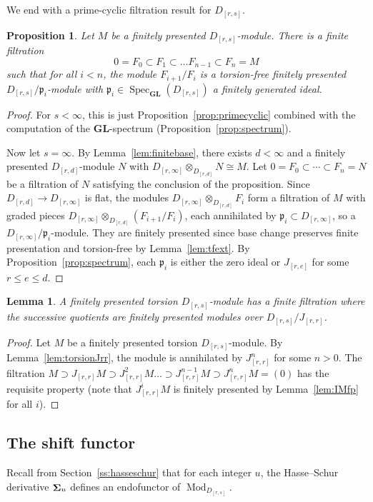 \documentclass[12pt]{amsart}
\newcommand{\fp}{\mathfrak{p}}
\DeclareMathOperator{\Spec}{Spec}
\DeclareMathOperator{\Mod}{Mod}
\DeclareMathOperator{\Sh}{\bf{\Sigma}}
\newcommand{\Drs}{D_{[r,s]}}
\newcommand{\Jrr}{J_{[r,r]}}
\newcommand{\Drinfty}{D_{[r,\infty]}}
\newcommand{\GL}{\mathbf{GL}}
\newcommand{\mShu}{\Sh_{u}}
\numberwithin{equation}{section}
\newtheorem{proposition}[equation]{Proposition}
\newtheorem{lemma}[equation]{Lemma}
\theoremstyle{definition}
\theoremstyle{plain}
\begin{document}
We end with a prime-cyclic filtration result for $\Drs$.
\begin{proposition}\label{prop:devissage}
   Let $M$ be a finitely presented $\Drs$-module. There is a finite filtration
   \[
   0 = F_0 \subset F_1 \subset \ldots F_{n-1} \subset F_n = M
   \]
   such that for all $i <n$, the module $F_{i+1}/F_i$ is a torsion-free finitely presented $\Drs/\fp_i$-module with $\fp_i \in \Spec_{\GL}(\Drs)$ a finitely generated ideal. 
\end{proposition}
\begin{proof}
    For $s < \infty$, this is just Proposition~\ref{prop:primecyclic} combined with the computation of the $\GL$-spectrum (Proposition~\ref{prop:spectrum}). 

    Now let $s = \infty$. By Lemma~\ref{lem:finitebase}, there exists $d < \infty$ and a finitely presented $D_{[r, d]}$-module $N$ with $\Drinfty \otimes_{D_{[r, d]}} N \cong M$. Let $0 = F_0 \subset \cdots \subset F_n = N$ be a filtration of $N$ satisfying the conclusion of the proposition. Since $D_{[r,d]} \to \Drinfty$ is flat, the modules $\Drinfty \otimes_{D_{[r,d]}} F_i$ form a filtration of $M$ with graded pieces $\Drinfty \otimes_{D_{[r,d]}} (F_{i+1}/F_i)$, each annihilated by $\fp_i \subset \Drinfty$, so a $\Drinfty/\fp_i$-module. They are finitely presented since base change preserves finite presentation and torsion-free by Lemma~\ref{lem:tfext}. By Proposition~\ref{prop:spectrum}, each $\fp_i$ is either the zero ideal or $J_{[r, e]}$ for some $r \leq e \leq d$. 
\end{proof}

\begin{lemma}\label{lem:torsiondevissage}
    A finitely presented torsion $\Drs$-module has a finite filtration where the successive quotients are finitely presented modules over $\Drs/\Jrr$.
\end{lemma}
\begin{proof}
    Let $M$ be a finitely presented torsion $\Drs$-module. By Lemma~\ref{lem:torsionJrr}, the module is annihilated by $\Jrr^n$ for some $n > 0$. The filtration $M \supset \Jrr M \supset \Jrr^2 M \ldots \supset \Jrr^{n-1} M \supset \Jrr^n M = (0)$ has the requisite property (note that $\Jrr^i M$ is finitely presented by Lemma~\ref{lem:IMfp} for all $i$).
\end{proof}




\subsection{The shift functor}\label{ss:shiftdefn}
Recall from Section~\ref{ss:hasseschur} that for each integer $u$, the Hasse--Schur derivative $\mShu$ defines an endofunctor of $\Mod_{\Drs}$. 
\end{document}
